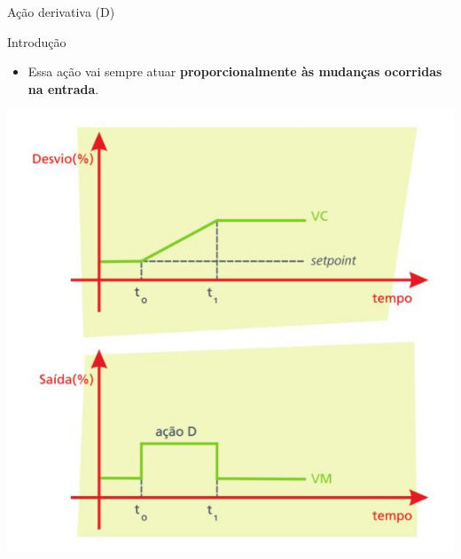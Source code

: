 \begin{frame}{Ação derivativa (D)}
	\begin{block}{Introdução}
		\begin{itemize}
			\item Essa ação vai sempre atuar \textbf{proporcionalmente às mudanças ocorridas na entrada}.
		\end{itemize}
	\end{block}
	
	
	\centering
	\includegraphics[height=0.7\textheight]{Figuras/Ch12/fig6}
\end{frame}


